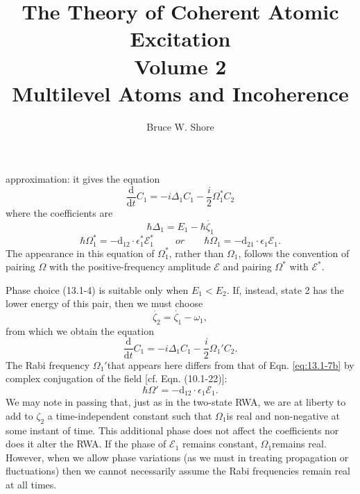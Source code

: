 \documentclass{book}
\author{Bruce W. Shore}
\title{The Theory of Coherent Atomic Excitation\\Volume 2\\Multilevel Atoms and Incoherence}
\begin{document}
\noindent
approximation: it gives the equation
\begin{equation}
	\frac{\mathrm d}{\mathrm d t}C_1 = - i \Delta _1 C_1 - \frac{i}{2} \Omega _1^* C_2
\end{equation}
where the coefficients are
\begin{equation}
	\hbar \Delta _1 = E_1 - \hbar \dot{ \zeta _1 }
\end{equation}
\begin{equation}
\label{eq:13.1-7b}
	\hbar \Omega _1^* = - \mathrm d_12 \cdot \epsilon _1^* \mathcal{E}_1^*\
	\qquad or \qquad \hbar \Omega _1 = - \mathrm{d_21} \cdot \epsilon _1 \mathcal{E}_1.
\end{equation}
The appearance in this equation of $\Omega _1^*$, rather than $\Omega _1$, follows the convention of pairing $\Omega$ with the positive-frequency amplitude $\mathcal{E}$ and pairing $\Omega^*$ with $\mathcal{E}^*$.

Phase choice (13.1-4) %
is suitable only when $E_1 < E_2$. If, instead, state 2 has the lower energy of this pair, then we must choose
\begin{equation}
	\dot{\zeta _2} = \dot{\zeta_1} - \omega _1,
\end{equation}
from which we obtain the equation
\begin{equation}
	\frac{\mathrm d}{\mathrm d t} C_1 = - i \Delta _1 C_1 - \frac{i}{2} \Omega _1' C_2.
\end{equation}
The Rabi frequency $\Omega _1' $that appears here differs from that of Eqn. \ref{eq:13.1-7b} by complex conjugation of the field [cf. Eqn. (10.1-22)]:
\begin{equation}
	\hbar \Omega ' = - \mathrm{d_12} \cdot \epsilon _1 \mathcal{E}_1.
\end{equation}
We may note in passing that, just as in the two-state RWA, we are at liberty to add to $ \zeta _2 $ a time-independent constant such that $ \Omega _1 $is real and non-negative at some instant of time. This additional phase does not affect the coefficients nor does it alter the RWA. If the phase of $ \mathcal{E}_1 $ remains constant, $\Omega _1 $remains real. However, when we allow phase variations (as we must in treating propagation or fluctuations) then we cannot necessarily assume the Rabi frequencies remain real at all times.
\end{document}

